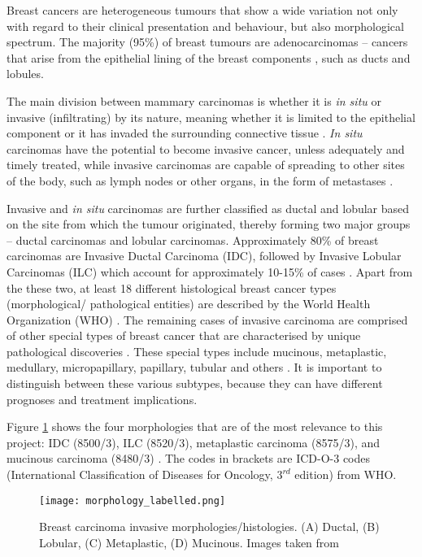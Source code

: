    
   Breast cancers are heterogeneous tumours that show a wide variation not only with regard to their clinical presentation and behaviour, but also morphological spectrum. The majority (95\%) of breast tumours are adenocarcinomas -- cancers that arise from the epithelial lining of the breast components \cite{Makki2015DiversityRelevance}, such as ducts and lobules.

    The main division between mammary carcinomas is whether it is \textit{in situ} or invasive (infiltrating) by its nature, meaning whether it is limited to the epithelial component or it has invaded the surrounding connective tissue \cite{Weigelt2008RefinementTypes}. \textit{In situ} carcinomas have the potential to become invasive cancer, unless adequately and timely treated, while invasive carcinomas are capable of spreading to other sites of the body, such as lymph nodes or other organs, in the form of metastases \cite{Makki2015DiversityRelevance}.

    Invasive and \textit{in situ} carcinomas are further classified as ductal and lobular based on the site from which the tumour originated, thereby forming two major groups --  ductal carcinomas and lobular carcinomas. Approximately 80\% of breast carcinomas are Invasive Ductal Carcinoma (IDC), followed by Invasive Lobular Carcinomas (ILC) which account for approximately 10-15\% of cases \cite{Weigelt2008RefinementTypes}. Apart from the these two, at least 18 different histological breast cancer types (morphological/ pathological entities) are described by the World Health Organization (WHO) \cite{walker2005world, 2011InternationalEd.}. The remaining cases of invasive carcinoma are comprised of other special types of breast cancer that are characterised by unique pathological discoveries \cite{Makki2015DiversityRelevance}. These special types include mucinous, metaplastic, medullary, micropapillary, papillary, tubular and others \cite{Weigelt2008RefinementTypes}. It is important to distinguish between these various subtypes, because they can have different prognoses and treatment implications.

    Figure \ref{fig:histology} shows the four morphologies that are of the most relevance to this project: IDC (8500/3), ILC (8520/3), metaplastic carcinoma (8575/3), and mucinous carcinoma (8480/3) \cite{Gathani2005BreastProgramme}. The codes in brackets are ICD-O-3 codes (International Classification of Diseases for Oncology, $3^{rd}$ edition) from WHO. 

   
            \begin{figure}[!h]
            \centering
            \texttt{[image: morphology\_labelled.png]}
            \caption[Breast carcinoma invasive morphologies/histologies.]{Breast carcinoma invasive morphologies/histologies. (A) Ductal, (B) Lobular, (C) Metaplastic, (D) Mucinous. Images taken from \cite{Ramnani2016Webpathology.com:Images, Abdelmessieh2016BreastOverview}}
            \label{fig:histology}
            \end{figure} 
    
